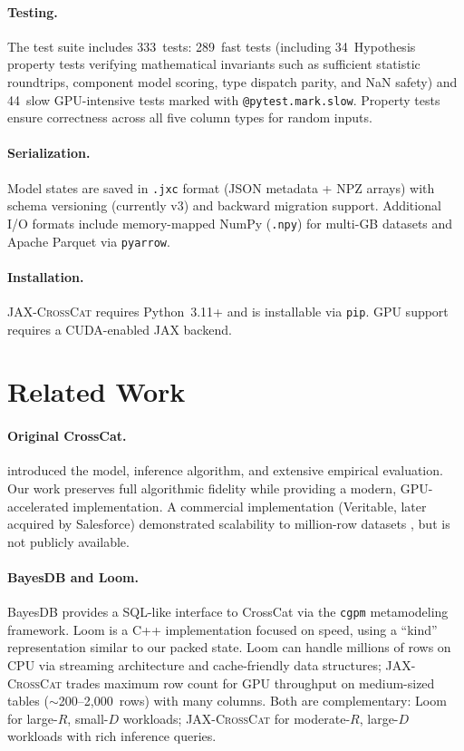 \documentclass[11pt]{article}
\newcommand{\jaxcc}{\textsc{JAX-CrossCat}}
\begin{document}
\paragraph{Testing.} The test suite includes 333~tests: 289~fast tests
(including 34~Hypothesis property tests verifying mathematical invariants
such as sufficient statistic roundtrips, component model scoring, type
dispatch parity, and NaN safety) and 44~slow GPU-intensive tests marked
with \texttt{@pytest.mark.slow}. Property tests ensure correctness
across all five column types for random inputs.

\paragraph{Serialization.} Model states are saved in \texttt{.jxc}
format (JSON metadata + NPZ arrays) with schema versioning (currently
v3) and backward migration support. Additional I/O formats include
memory-mapped NumPy (\texttt{.npy}) for multi-GB datasets and Apache
Parquet via \texttt{pyarrow}.

\paragraph{Installation.} \jaxcc{} requires Python~3.11+ and is
installable via \texttt{pip}. GPU support requires a CUDA-enabled JAX
backend.

\section{Related Work}
\label{sec:related}

\paragraph{Original CrossCat.} \citet{mansinghka2016crosscat} introduced
the model, inference algorithm, and extensive empirical evaluation. Our
work preserves full algorithmic fidelity while providing a modern,
GPU-accelerated implementation. A commercial implementation (Veritable,
later acquired by Salesforce) demonstrated scalability to million-row
datasets \citep{obermeyer2014scaling}, but is not publicly available.

\paragraph{BayesDB and Loom.} BayesDB \citep{mansinghka2015bayesdb}
provides a SQL-like interface to CrossCat via the \texttt{cgpm}
metamodeling framework. Loom \citep{loom} is a C++ implementation
focused on speed, using a ``kind'' representation similar to our packed
state. Loom can handle millions of rows on CPU via streaming
architecture and cache-friendly data structures; \jaxcc{} trades
maximum row count for GPU throughput on medium-sized tables
(${\sim}$200--2,000~rows) with many columns. Both are complementary:
Loom for large-$R$, small-$D$ workloads; \jaxcc{} for moderate-$R$,
large-$D$ workloads with rich inference queries.
\end{document}

